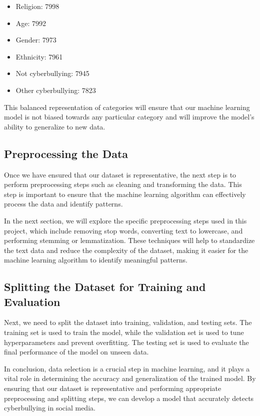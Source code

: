 \documentclass[conference]{IEEEtran}
\begin{document}
\begin{itemize}
\item Religion: 7998
\item Age: 7992
\item Gender: 7973
\item Ethnicity: 7961
\item Not cyberbullying: 7945
\item Other cyberbullying: 7823
\end{itemize}

This balanced representation of categories will ensure that our machine learning model is not biased towards any particular category and will improve the model's ability to generalize to new data.


\subsection{Preprocessing the Data}

Once we have ensured that our dataset is representative, the next step is to perform preprocessing steps such as cleaning and transforming the data. This step is important to ensure that the machine learning algorithm can effectively process the data and identify patterns.

In the next section, we will explore the specific preprocessing steps used in this project, which include removing stop words, converting text to lowercase, and performing stemming or lemmatization. These techniques will help to standardize the text data and reduce the complexity of the dataset, making it easier for the machine learning algorithm to identify meaningful patterns.

\subsection{Splitting the Dataset for Training and Evaluation}

Next, we need to split the dataset into training, validation, and testing sets. The training set is used to train the model, while the validation set is used to tune hyperparameters and prevent overfitting. The testing set is used to evaluate the final performance of the model on unseen data.

In conclusion, data selection is a crucial step in machine learning, and it plays a vital role in determining the accuracy and generalization of the trained model. By ensuring that our dataset is representative and performing appropriate preprocessing and splitting steps, we can develop a model that accurately detects cyberbullying in social media.
\end{document}
